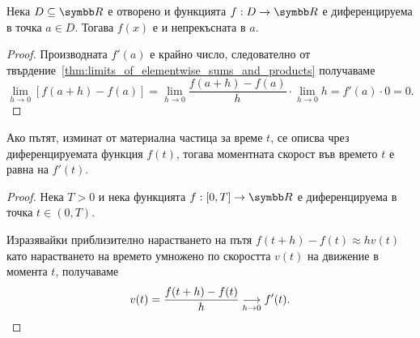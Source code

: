 \documentclass[numbers=endperiod, bibliography=totocnumbered]{scrartcl}
\begin{document}
\begin{proposition}
  Нека \( D \subseteq \R \) е отворено и функцията \( f: D \to \R \) е диференцируема в точка \( a \in D \). Тогава \( f(x) \) е и непрекъсната в \( a \).
\end{proposition}
\begin{proof}
  Производната \( f'(a) \) е крайно число, следователно от твърдение~\ref{thm:limits_of_elementwise_sums_and_products} получаваме
  \begin{equation*}
    \lim_{h \to 0} [f(a+h) - f(a)]
    =
    \lim_{h \to 0} \frac {f(a+h) - f(a)} h \cdot \lim_{h \to 0} h
    =
    f'(a) \cdot 0
    =
    0.
  \end{equation*}
\end{proof}

\begin{theorem}
  Ако пътят, изминат от материална частица за време \( t \), се описва чрез диференцируемата функция \( f(t) \), тогава моментната скорост във времето \( t \) е равна на \( f'(t) \).
\end{theorem}
\begin{proof}
  Нека \( T > 0 \) и нека функцията \( f: [0, T] \to \R \) е диференцируема в точка \( t \in (0, T) \).

  Изразявайки приблизително нарастването на пътя \( f(t+h) - f(t) \approx h v(t) \) като нарастването на времето умножено по скоростта \( v(t) \) на движение в момента \( t \), получаваме
  \begin{equation*}
    v(t) = \frac{f(t+h) - f(t)} {h} \Conv[h \to 0]{} f'(t).
  \end{equation*}
\end{proof}
\end{document}
